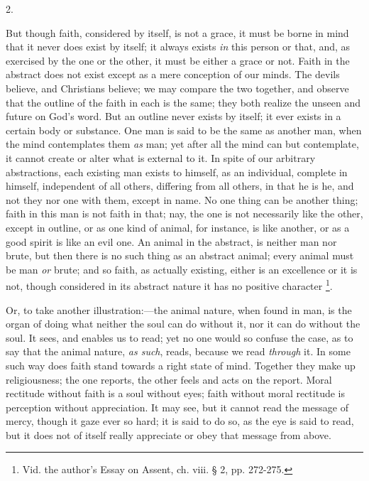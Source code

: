 2.

But though faith, considered by itself, is not a grace, it must be
borne in mind that it never does exist by itself; it always exists \emph{in}
this person or that, and, as exercised by the one or the other, it
must be either a grace or not. Faith in the abstract does not exist
except as a mere conception of our minds. The devils believe, and
Christians believe; we may compare the two together, and observe that
the outline of the faith in each is the same; they both realize the
unseen and future on God's word. But an outline never exists by
itself; it ever exists in a certain body or substance. One man is said
to be the same as another man, when the mind contemplates them \emph{as}
man; yet after all the mind can but contemplate, it cannot create or
alter what is external to it. In spite of our arbitrary abstractions,
each existing man exists to himself, as an individual, complete in
himself, independent of all others, differing from all others, in that
he is he, and not they nor one with them, except in name. No one thing
can be another thing; faith in this man is not faith in that; nay, the
one is not necessarily like the other, except in outline, or as one
kind of animal, for instance, is like another, or as a good spirit is
like an evil one. An animal in the abstract, is neither man nor brute,
but then there is no such thing as an abstract animal; every animal
must be man \emph{or} brute; and so faith, as actually existing,
either is an excellence or it is not, though considered in its
abstract nature it has no positive character \footnote{Vid. the
author's Essay on Assent, ch. viii. § 2, pp. 272-275.}.

Or, to take another illustration:—the animal nature, when found
in man, is the organ of doing what neither the soul can do without it,
nor it can do without the soul. It sees, and enables us to read; yet
no one would so confuse the case, as to say that the animal nature, \emph{as
such}, reads, because we read \emph{through} it. In some such way
does faith stand towards a right state of mind. Together they make up
religiousness; the one reports, the other feels and acts on the
report. Moral rectitude without faith is a soul without eyes; faith
without moral rectitude is perception without appreciation. It may
see, but it cannot read the message of mercy, though it gaze ever so
hard; it is said to do so, as the eye is said to read, but it does not
of itself really appreciate or obey that message from above.

